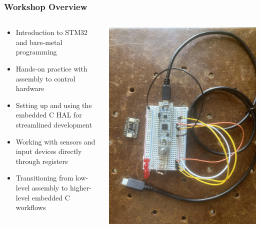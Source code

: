 \documentclass{beamer}
\begin{document}
\begin{frame}
    \frametitle{Workshop Overview}
    \begin{columns}
        \begin{column}{0.55\textwidth}
            \begin{itemize}
                \item Introduction to STM32 and bare-metal programming
                \item Hands-on practice with assembly to control hardware
                \item Setting up and using the embedded C HAL for streamlined development
                \item Working with sensors and input devices directly through registers
                \item Transitioning from low-level assembly to higher-level embedded C workflows
            \end{itemize}
        \end{column}
        \begin{column}{0.4\textwidth}
            \begin{center}
                \includegraphics[width=\textwidth]{images/nuwc-advanced-embedded-workshop-overview.jpg}
            \end{center}
        \end{column}
    \end{columns}
\end{frame}
\end{document}
